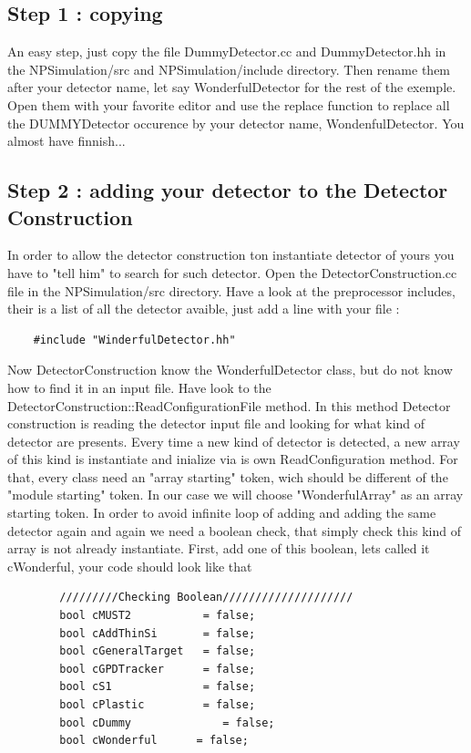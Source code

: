 \documentclass{book}
\begin{document}
	\subsection{Step 1 : copying}
		An easy step, just copy the file DummyDetector.cc and DummyDetector.hh in the NPSimulation/src and NPSimulation/include directory. 
		Then rename them after your detector name, let say WonderfulDetector for the rest of the exemple. 
		Open them with your favorite editor and use the replace function to replace all the DUMMYDetector occurence by your detector name, WondenfulDetector. 
		You almost have finnish...

	\subsection{Step 2 : adding your detector to the Detector Construction}
		In order to allow the detector construction ton instantiate detector of yours you have to "tell him" to search for such detector. 
		Open the DetectorConstruction.cc file in the NPSimulation/src directory. 
		Have a look at the preprocessor includes, their is a list of all the detector avaible, just add a line with your file :
	\begin{verbatim}
	#include "WinderfulDetector.hh"
	\end{verbatim}

		Now DetectorConstruction know the WonderfulDetector class, but do not know how to find it in an input file. 
		Have look to the DetectorConstruction::ReadConfigurationFile method. 
		In this method Detector construction is reading the detector input file and looking for what kind of detector are presents. 
		Every time a new kind of detector is detected, a new array of this kind is instantiate and inialize via is own ReadConfiguration method. 
		For that, every class need an "array starting" token, wich should be different of the "module starting" token. 
		In our case we will choose "WonderfulArray" as an array starting token. 
		In order to avoid infinite loop of adding and adding the same detector again and again we need a boolean check, that simply check this kind of array is not already instantiate. 
		First, add one of this boolean, lets called it cWonderful, your code should look like that

	\begin{verbatim}
		/////////Checking Boolean////////////////////
		bool cMUST2           = false;
		bool cAddThinSi       = false;
		bool cGeneralTarget   = false;
		bool cGPDTracker      = false;	
		bool cS1              = false;
		bool cPlastic         = false;
		bool cDummy         	 = false;
		bool cWonderful		 = false;
	\end{verbatim}
\end{document}
